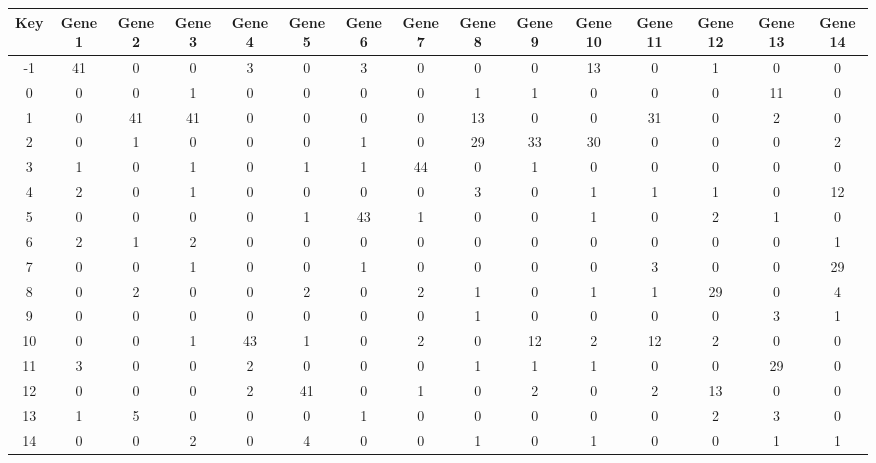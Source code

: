\begin{tabular}{|c|c|c|c|c|c|c|c|c|c|c|c|c|c|c|}
\hline
Key & Gene 1 & Gene 2 & Gene 3 & Gene 4 & Gene 5 & Gene 6 & Gene 7 & Gene 8 & Gene 9 & Gene 10 & Gene 11 & Gene 12 & Gene 13 & Gene 14 \\
\hline
-1 & 41 & 0 & 0 & 3 & 0 & 3 & 0 & 0 & 0 & 13 & 0 & 1 & 0 & 0 \\
0 & 0 & 0 & 1 & 0 & 0 & 0 & 0 & 1 & 1 & 0 & 0 & 0 & 11 & 0 \\
1 & 0 & 41 & 41 & 0 & 0 & 0 & 0 & 13 & 0 & 0 & 31 & 0 & 2 & 0 \\
2 & 0 & 1 & 0 & 0 & 0 & 1 & 0 & 29 & 33 & 30 & 0 & 0 & 0 & 2 \\
3 & 1 & 0 & 1 & 0 & 1 & 1 & 44 & 0 & 1 & 0 & 0 & 0 & 0 & 0 \\
4 & 2 & 0 & 1 & 0 & 0 & 0 & 0 & 3 & 0 & 1 & 1 & 1 & 0 & 12 \\
5 & 0 & 0 & 0 & 0 & 1 & 43 & 1 & 0 & 0 & 1 & 0 & 2 & 1 & 0 \\
6 & 2 & 1 & 2 & 0 & 0 & 0 & 0 & 0 & 0 & 0 & 0 & 0 & 0 & 1 \\
7 & 0 & 0 & 1 & 0 & 0 & 1 & 0 & 0 & 0 & 0 & 3 & 0 & 0 & 29 \\
8 & 0 & 2 & 0 & 0 & 2 & 0 & 2 & 1 & 0 & 1 & 1 & 29 & 0 & 4 \\
9 & 0 & 0 & 0 & 0 & 0 & 0 & 0 & 1 & 0 & 0 & 0 & 0 & 3 & 1 \\
10 & 0 & 0 & 1 & 43 & 1 & 0 & 2 & 0 & 12 & 2 & 12 & 2 & 0 & 0 \\
11 & 3 & 0 & 0 & 2 & 0 & 0 & 0 & 1 & 1 & 1 & 0 & 0 & 29 & 0 \\
12 & 0 & 0 & 0 & 2 & 41 & 0 & 1 & 0 & 2 & 0 & 2 & 13 & 0 & 0 \\
13 & 1 & 5 & 0 & 0 & 0 & 1 & 0 & 0 & 0 & 0 & 0 & 2 & 3 & 0 \\
14 & 0 & 0 & 2 & 0 & 4 & 0 & 0 & 1 & 0 & 1 & 0 & 0 & 1 & 1 \\
\hline
\end{tabular}